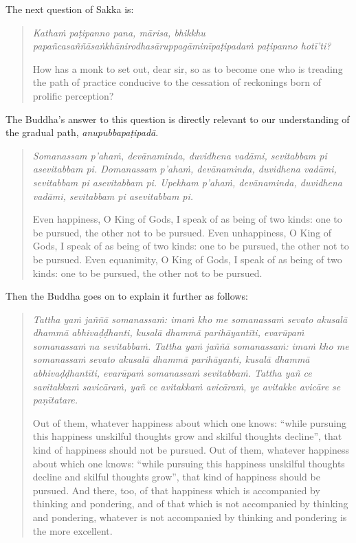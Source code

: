 The next question of Sakka is:

\begin{quote}
\emph{Kathaṁ paṭipanno pana, mārisa, bhikkhu papañcasaññāsaṅkhānirodhasāruppagāminīpaṭipadaṁ paṭipanno hotī'ti?}

How has a monk to set out, dear sir, so as to become one who is treading the path of practice conducive to the cessation of reckonings born of prolific perception?
\end{quote}

The Buddha's answer to this question is directly relevant to our understanding of the gradual path, \emph{anupubbapaṭipadā}.

\begin{quote}
\emph{Somanassam p'ahaṁ, devānaminda, duvidhena vadāmi, sevitabbam pi asevitabbam pi. Domanassam p'ahaṁ, devānaminda, duvidhena vadāmi, sevitabbam pi asevitabbam pi. Upekham p'ahaṁ, devānaminda, duvidhena vadāmi, sevitabbam pi asevitabbam pi.}

Even happiness, O King of Gods, I speak of as being of two kinds: one to be pursued, the other not to be pursued. Even unhappiness, O King of Gods, I speak of as being of two kinds: one to be pursued, the other not to be pursued. Even equanimity, O King of Gods, I speak of as being of two kinds: one to be pursued, the other not to be pursued.
\end{quote}

Then the Buddha goes on to explain it further as follows:

\begin{quote}
\emph{Tattha yaṁ jaññā somanassaṁ: imaṁ kho me somanassaṁ sevato akusalā dhammā abhivaḍḍhanti, kusalā dhammā parihāyantīti, evarūpaṁ somanassaṁ na sevitabbaṁ. Tattha yaṁ jaññā somanassaṁ: imaṁ kho me somanassaṁ sevato akusalā dhammā parihāyanti, kusalā dhammā abhivaḍḍhantīti, evarūpaṁ somanassaṁ sevitabbaṁ. Tattha yañ ce savitakkaṁ savicāraṁ, yañ ce avitakkaṁ avicāraṁ, ye avitakke avicāre se paṇītatare.}

Out of them, whatever happiness about which one knows: ``while pursuing this happiness unskilful thoughts grow and skilful thoughts decline'', that kind of happiness should not be pursued. Out of them, whatever happiness about which one knows: ``while pursuing this happiness unskilful thoughts decline and skilful thoughts grow'', that kind of happiness should be pursued. And there, too, of that happiness which is accompanied by thinking and pondering, and of that which is not accompanied by thinking and pondering, whatever is not accompanied by thinking and pondering is the more excellent.
\end{quote}


